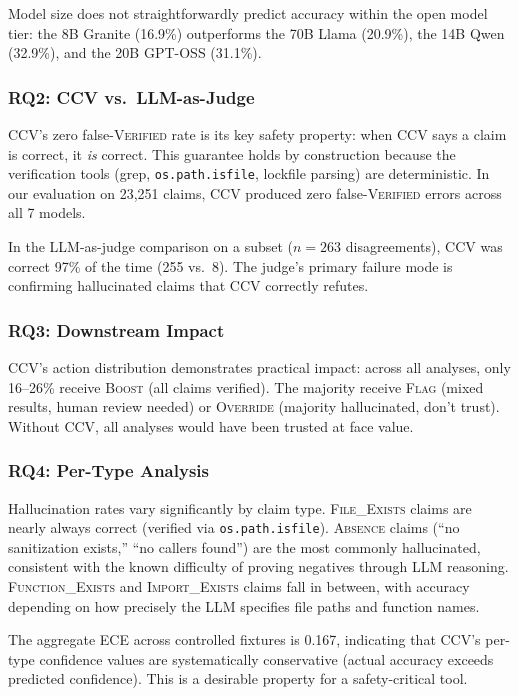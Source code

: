 Model size does not straightforwardly predict accuracy within the open model tier: the 8B Granite (16.9\%) outperforms the 70B Llama (20.9\%), the 14B Qwen (32.9\%), and the 20B GPT-OSS (31.1\%).

\subsubsection{RQ2: CCV vs.\ LLM-as-Judge}

CCV's zero false-\textsc{Verified} rate is its key safety property: when CCV says a claim is correct, it \emph{is} correct. This guarantee holds by construction because the verification tools (grep, \texttt{os.path.isfile}, lockfile parsing) are deterministic. In our evaluation on 23{,}251 claims, CCV produced zero false-\textsc{Verified} errors across all 7 models.

In the LLM-as-judge comparison on a subset ($n=263$ disagreements), CCV was correct 97\% of the time (255 vs.\ 8). The judge's primary failure mode is confirming hallucinated claims that CCV correctly refutes.

\subsubsection{RQ3: Downstream Impact}

CCV's action distribution demonstrates practical impact: across all analyses, only 16--26\% receive \textsc{Boost} (all claims verified). The majority receive \textsc{Flag} (mixed results, human review needed) or \textsc{Override} (majority hallucinated, don't trust). Without CCV, all analyses would have been trusted at face value.

\subsubsection{RQ4: Per-Type Analysis}

Hallucination rates vary significantly by claim type. \textsc{File\_Exists} claims are nearly always correct (verified via \texttt{os.path.isfile}). \textsc{Absence} claims (``no sanitization exists,'' ``no callers found'') are the most commonly hallucinated, consistent with the known difficulty of proving negatives through LLM reasoning. \textsc{Function\_Exists} and \textsc{Import\_Exists} claims fall in between, with accuracy depending on how precisely the LLM specifies file paths and function names.

The aggregate ECE across controlled fixtures is 0.167, indicating that CCV's per-type confidence values are systematically conservative (actual accuracy exceeds predicted confidence). This is a desirable property for a safety-critical tool.
